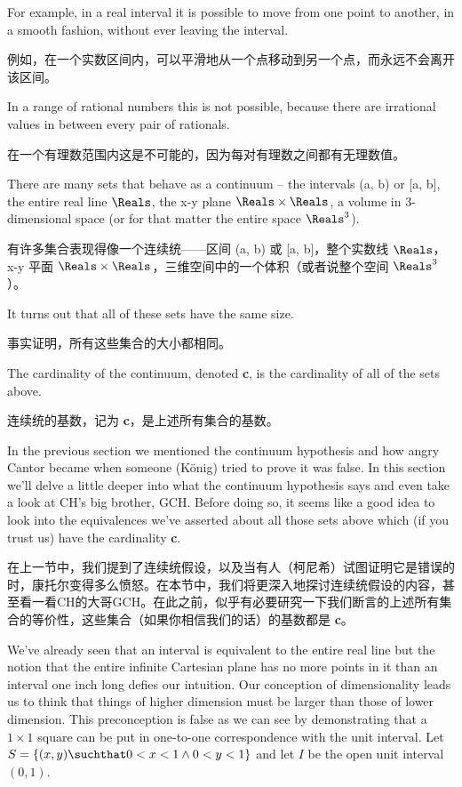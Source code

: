 For example, in a real interval
it is possible to move from one point to another, in a smooth fashion, without
ever leaving the interval.

例如，在一个实数区间内，可以平滑地从一个点移动到另一个点，而永远不会离开该区间。

In a range of rational numbers this is not possible,
because there are irrational values in between every pair of rationals.

在一个有理数范围内这是不可能的，因为每对有理数之间都有无理数值。

There
are many sets that behave as a continuum -- the intervals (a, b) or [a, b], the
entire real line $\Reals$, the x-y plane $\Reals \times \Reals$, a volume in 3-dimensional space (or
for that matter the entire space $\Reals^3$).

有许多集合表现得像一个连续统——区间 (a, b) 或 [a, b]，整个实数线 $\Reals$，x-y 平面 $\Reals \times \Reals$，三维空间中的一个体积（或者说整个空间 $\Reals^3$）。

It turns out that all of these sets have
the same size.

事实证明，所有这些集合的大小都相同。

The cardinality of the continuum, denoted {\bf c}, is the cardinality of all of the
sets above.

连续统的基数，记为 {\bf c}，是上述所有集合的基数。

In the previous section we mentioned the continuum hypothesis and how
angry Cantor became when someone (K\"{o}nig) tried to prove it
was false.   In this section we'll delve a little deeper into what the
continuum hypothesis says and even take a look at CH's big brother, GCH.
Before doing so, it seems like a good idea to look into the equivalences
we've asserted about all those sets above which (if you trust us) have the
cardinality {\bf c}.

在上一节中，我们提到了连续统假设，以及当有人（柯尼希）试图证明它是错误的时，康托尔变得多么愤怒。在本节中，我们将更深入地探讨连续统假设的内容，甚至看一看CH的大哥GCH。在此之前，似乎有必要研究一下我们断言的上述所有集合的等价性，这些集合（如果你相信我们的话）的基数都是 {\bf c}。

We've already seen that an interval is equivalent to the entire
real line but the notion that the entire infinite Cartesian plane has no more
points in it than
an interval one inch long defies our intuition.  Our conception
of dimensionality leads us to think that things of higher dimension must be
larger than those of lower dimension.  This preconception is false as we can see
by demonstrating that a $1 \times 1$  square can be put in one-to-one correspondence
with the unit interval.
Let $S = \{ (x, y) \suchthat 0 < x < 1 \land  0 < y < 1 \}$ and let $I$ be
the open unit interval $(0, 1)$.

